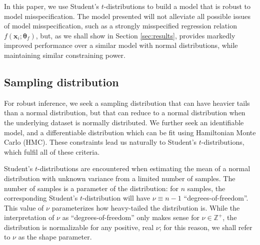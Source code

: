 \documentclass[fleqn,usenatbib]{rasti}
\begin{document}
In this paper, we use Student's $t$-distributions to build a model that is
robust to model misspecification.  The model presented will not alleviate all
possible issues of model misspecification, such as a strongly misspecified
regression relation $f(\mathbf{x}_i; \mathbf{\theta}_f)$, but, as we shall show
in Section \ref{sec:results}, provides markedly improved performance over a
similar model with normal distributions, while maintaining similar constraining
power.

\subsection{Sampling distribution}
\label{sec:formalism.sampling}

For robust inference, we seek a sampling distribution that can have heavier
tails than a normal distribution, but that can reduce to a normal distribution
when the underlying dataset is normally distributed. We further seek an
identifiable model, and a differentiable distribution which can be fit using
Hamiltonian Monte Carlo (HMC). These constraints lead us naturally to Student's
$t$-distributions, which fulfil all of these criteria.

Student's $t$-distributions are encountered when estimating the mean of a normal
distribution with unknown variance from a limited number of samples. The number
of samples is a parameter of the distribution: for $n$ samples, the
corresponding Student's $t$-distribution will have $\nu \equiv n - 1$
``degrees-of-freedom''. This value of $\nu$ parameterizes how heavy-tailed the
distribution is. While the interpretation of $\nu$ as ``degrees-of-freedom''
only makes sense for $\nu \in \mathbb Z^+$, the distribution is normalizable for
any positive, real $\nu$; for this reason, we shall refer to $\nu$ as the shape
parameter.
\end{document}
